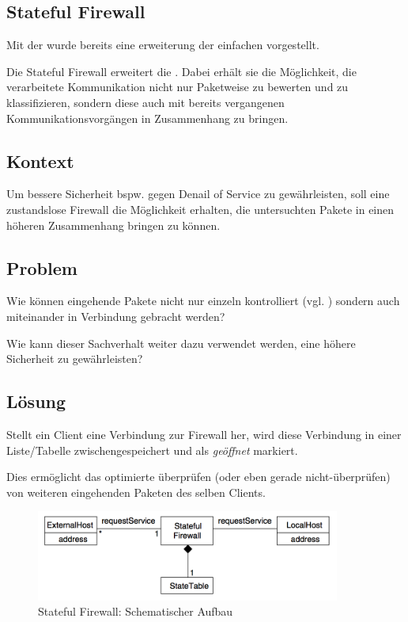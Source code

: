 \subsection{Stateful Firewall}
Mit der  wurde bereits eine erweiterung der einfachen  vorgestellt.

Die Stateful Firewall erweitert die . Dabei erhält sie die Möglichkeit, die verarbeitete Kommunikation nicht nur Paketweise zu bewerten und zu klassifizieren, sondern diese auch mit bereits vergangenen Kommunikationsvorgängen in Zusammenhang zu bringen.

\subsection*{Kontext}
Um bessere Sicherheit bspw. gegen Denail of Service \cite{DoS} zu gewährleisten, soll eine zustandslose Firewall die Möglichkeit erhalten, die untersuchten Pakete in einen höheren Zusammenhang bringen zu können.

\subsection*{Problem}
Wie können eingehende Pakete nicht nur einzeln kontrolliert (vgl. ) sondern auch miteinander in Verbindung gebracht werden?

Wie kann dieser Sachverhalt weiter dazu verwendet werden, eine höhere Sicherheit zu gewährleisten?


\subsection*{Lösung}
Stellt ein Client eine Verbindung zur Firewall her, wird diese Verbindung in einer Liste/Tabelle zwischengespeichert und als \emph{geöffnet} markiert.

Dies ermöglicht das optimierte überprüfen (oder eben gerade nicht-überprüfen) von weiteren eingehenden Paketen des selben Clients.

\begin{figure}[H]
	\centering
	\includegraphics[width=10cm]{content/security/firewall-architectures/images/stateful-structure.png}
	\caption{Stateful Firewall: Schematischer Aufbau}
\end{figure}

